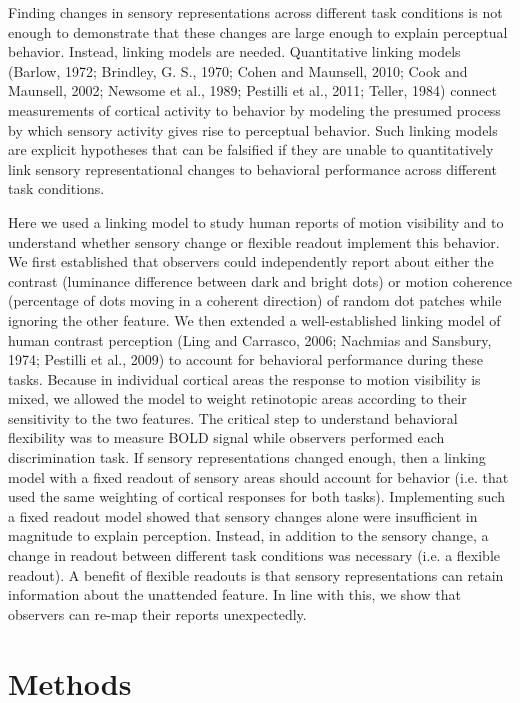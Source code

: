 \documentclass{report}
\begin{document}
Finding changes in sensory representations across different task conditions is not enough to demonstrate that these changes are large enough to explain perceptual behavior.  Instead, linking models are needed. Quantitative linking models (Barlow, 1972; Brindley, G. S., 1970; Cohen and Maunsell, 2010; Cook and Maunsell, 2002; Newsome et al., 1989; Pestilli et al., 2011; Teller, 1984) connect measurements of cortical activity to behavior by modeling the presumed process by which sensory activity gives rise to perceptual behavior. Such linking models are explicit hypotheses that can be falsified if they are unable to quantitatively link sensory representational changes to behavioral performance across different task conditions.

Here we used a linking model to study human reports of motion visibility and to understand whether sensory change or flexible readout implement this behavior. We first established that observers could independently report about either the contrast (luminance difference between dark and bright dots) or motion coherence (percentage of dots moving in a coherent direction) of random dot patches while ignoring the other feature. We then extended a well-established linking model of human contrast perception \citep{Boynton1999-jd,Foley1981-aw,Gardner2015-bd} (Ling and Carrasco, 2006; Nachmias and Sansbury, 1974; Pestilli et al., 2009) to account for behavioral performance during these tasks. Because in individual cortical areas the response to motion visibility is mixed, we allowed the model to weight retinotopic areas according to their sensitivity to the two features. The critical step to understand behavioral flexibility was to measure BOLD signal while observers performed each discrimination task. If sensory representations changed enough, then a linking model with a fixed readout of sensory areas should account for behavior (i.e. that used the same weighting of cortical responses for both tasks). Implementing such a fixed readout model showed that sensory changes alone were insufficient in magnitude to explain perception. Instead, in addition to the sensory change, a change in readout between different task conditions was necessary (i.e. a flexible readout). A benefit of flexible readouts is that sensory representations can retain information about the unattended feature. In line with this, we show that observers can re-map their reports unexpectedly. 

\section{Methods}
\end{document}
